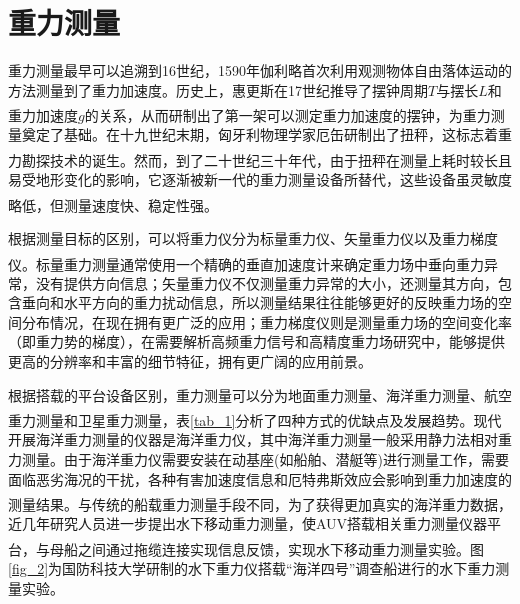 \documentclass[12pt,a4,utf8]{article}
\newcommand{\upcite}[1]{\textsuperscript{\textsuperscript{\cite{#1}}}} %
\begin{document}
\section{重力测量}
      重力测量最早可以追溯到16世纪，1590年伽利略首次利用观测物体自由落体运动的方法测量到了重力加速度。历史上，惠更斯在17世纪推导了摆钟周期$T$与摆长$L$和重力加速度$g$的关系，从而研制出了第一架可以测定重力加速度的摆钟\upcite{snelders1989christiaan}，为重力测量奠定了基础。在十九世纪末期，匈牙利物理学家厄缶研制出了扭秤，这标志着重力勘探技术的诞生\upcite{szabo2016history,veryaskin2021gravity}。然而，到了二十世纪三十年代，由于扭秤在测量上耗时较长且易受地形变化的影响，它逐渐被新一代的重力测量设备所替代，这些设备虽灵敏度略低，但测量速度快、稳定性强\upcite{chendaiyong}。

根据测量目标的区别，可以将重力仪分为标量重力仪、矢量重力仪以及重力梯度仪\upcite{schwarz1995some}。标量重力测量通常使用一个精确的垂直加速度计来确定重力场中垂向重力异常，没有提供方向信息；矢量重力仪不仅测量重力异常的大小，还测量其方向，包含垂向和水平方向的重力扰动信息，所以测量结果往往能够更好的反映重力场的空间分布情况，在现在拥有更广泛的应用；重力梯度仪则是测量重力场的空间变化率（即重力势的梯度），在需要解析高频重力信号和高精度重力场研究中，能够提供更高的分辨率和丰富的细节特征，拥有更广阔的应用前景。

根据搭载的平台设备区别，重力测量可以分为地面重力测量、海洋重力测量、航空重力测量和卫星重力测量\upcite{hirt2013new,liang2020high,kwon2001new}，表\ref{tab_1}分析了四种方式的优缺点及发展趋势。现代开展海洋重力测量的仪器是海洋重力仪，其中海洋重力测量一般采用静力法相对重力测量。由于海洋重力仪需要安装在动基座(如船舶、潜艇等)进行测量工作，需要面临恶劣海况的干扰，各种有害加速度信息和厄特弗斯效应会影响到重力加速度的测量结果\upcite{ZGZC201808001017}。与传统的船载重力测量手段不同，为了获得更加真实的海洋重力数据，近几年研究人员进一步提出水下移动重力测量，使AUV搭载相关重力测量仪器平台，与母船之间通过拖缆连接实现信息反馈，实现水下移动重力测量实验\upcite{1021532813.nh}。图\ref{fig_2}为国防科技大学研制的水下重力仪搭载“海洋四号”调查船进行的水下重力测量实验。
\end{document}
